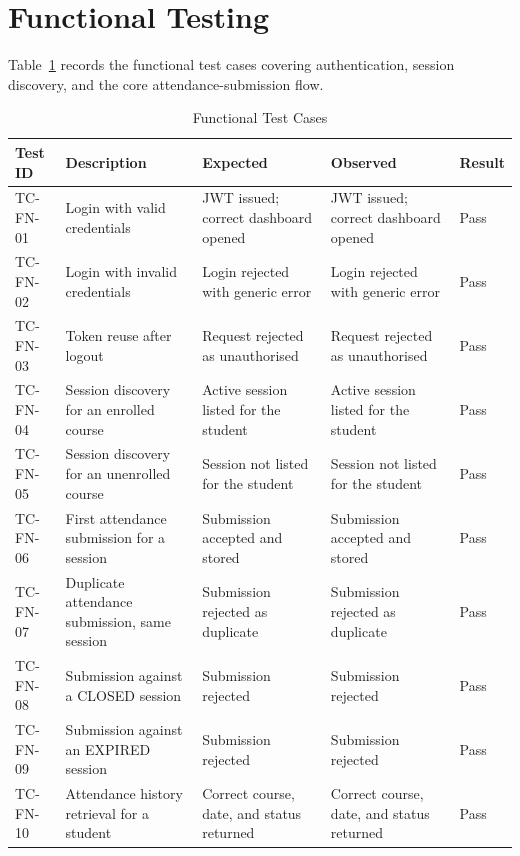 \documentclass[12pt, a4paper, oneside]{report}
\begin{document}
\section{Functional Testing}

Table~\ref{tab:functional-tests} records the functional test cases covering authentication, session discovery, and the core attendance-submission flow.

\begin{table}[p]
\centering
\caption{Functional Test Cases}
\label{tab:functional-tests}
\tiny
\setlength{\tabcolsep}{3pt}
\renewcommand{\arraystretch}{1.03}
\begin{tabularx}{\textwidth}{|p{1.8cm}|X|X|X|p{0.9cm}|}
\hline
\textbf{Test ID} & \textbf{Description} & \textbf{Expected} & \textbf{Observed} & \textbf{Result} \\
\hline
TC-FN-01 & Login with valid credentials & JWT issued; correct dashboard opened & JWT issued; correct dashboard opened & Pass \\
\hline
TC-FN-02 & Login with invalid credentials & Login rejected with generic error & Login rejected with generic error & Pass \\
\hline
TC-FN-03 & Token reuse after logout & Request rejected as unauthorised & Request rejected as unauthorised & Pass \\
\hline
TC-FN-04 & Session discovery for an enrolled course & Active session listed for the student & Active session listed for the student & Pass \\
\hline
TC-FN-05 & Session discovery for an unenrolled course & Session not listed for the student & Session not listed for the student & Pass \\
\hline
TC-FN-06 & First attendance submission for a session & Submission accepted and stored & Submission accepted and stored & Pass \\
\hline
TC-FN-07 & Duplicate attendance submission, same session & Submission rejected as duplicate & Submission rejected as duplicate & Pass \\
\hline
TC-FN-08 & Submission against a CLOSED session & Submission rejected & Submission rejected & Pass \\
\hline
TC-FN-09 & Submission against an EXPIRED session & Submission rejected & Submission rejected & Pass \\
\hline
TC-FN-10 & Attendance history retrieval for a student & Correct course, date, and status returned & Correct course, date, and status returned & Pass \\
\hline
\end{tabularx}
\end{table}
\end{document}
